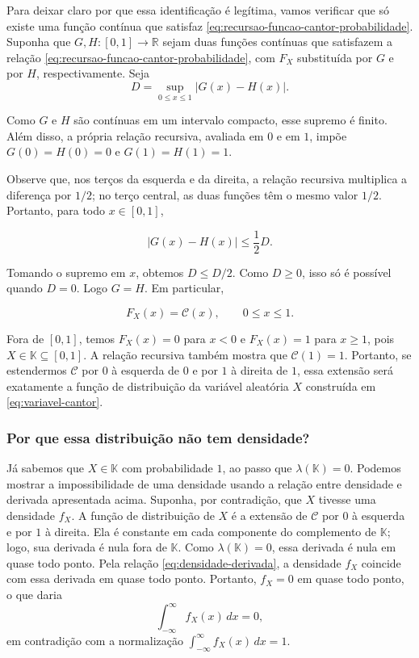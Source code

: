 \documentclass[12pt,portuguese]{article}
\theoremstyle{definition}
\theoremstyle{plainexercise}
\theoremstyle{starredexercise}
\theoremstyle{definition}
\begin{document}
Para deixar claro por que essa identificação é legítima, vamos verificar que
só existe uma função contínua que satisfaz \eqref{eq:recursao-funcao-cantor-probabilidade}.
Suponha que $G,H:[0,1]\to\mathbb{R}$ sejam duas funções contínuas que satisfazem a
relação \eqref{eq:recursao-funcao-cantor-probabilidade}, com $F_X$ substituída
por $G$ e por $H$, respectivamente.
Seja
\[
  D=\sup_{0\leqslant x\leqslant 1}|G(x)-H(x)|.
\]

Como $G$ e $H$ são contínuas em um intervalo compacto, esse supremo é finito.
Além disso, a própria relação recursiva, avaliada em $0$ e em $1$, impõe
$G(0)=H(0)=0$ e $G(1)=H(1)=1$.

Observe que, nos terços da esquerda e da direita, a relação recursiva multiplica a diferença por
$1/2$; no terço central, as duas funções têm o mesmo valor $1/2$. Portanto,
para todo $x\in[0,1]$,

\[
  |G(x)-H(x)|\leqslant\frac{1}{2}D.
\]

Tomando o supremo em $x$, obtemos $D\leqslant D/2$. Como $D\geqslant0$, isso
só é possível quando $D=0$. Logo $G=H$. Em particular,

\begin{equation}\label{eq:funcao-distribuicao-cantor}
  F_X(x)=\mathcal{C}(x),
  \qquad 0\leqslant x\leqslant 1.
\end{equation}

Fora de $[0,1]$, temos $F_X(x)=0$ para $x<0$ e $F_X(x)=1$ para $x\geqslant1$,
pois $X\in\mathbb{K}\subseteq[0,1]$. A relação recursiva também mostra que
$\mathcal{C}(1)=1$. Portanto, se estendermos $\mathcal{C}$ por $0$ à esquerda
de $0$ e por $1$ à direita de $1$, essa extensão será exatamente a função de
distribuição da variável aleatória $X$ construída em
\eqref{eq:variavel-cantor}.

\subsubsection{Por que essa distribuição não tem densidade?}

Já sabemos que $X\in\mathbb{K}$ com probabilidade $1$, ao passo que
$\lambda(\mathbb{K})=0$. Podemos mostrar a impossibilidade de uma densidade
usando a relação entre densidade e derivada apresentada acima. Suponha, por
contradição, que $X$ tivesse uma densidade $f_X$. A função de distribuição de
$X$ é a extensão de $\mathcal{C}$ por $0$ à esquerda e por $1$ à direita. Ela
é constante em cada componente do complemento de $\mathbb{K}$; logo, sua
derivada é nula fora de $\mathbb{K}$. Como $\lambda(\mathbb{K})=0$, essa
derivada é nula em quase todo ponto. Pela relação \eqref{eq:densidade-derivada},
a densidade $f_X$ coincide com essa derivada em quase todo ponto. Portanto,
$f_X=0$ em quase todo ponto, o que daria
\[
  \int_{-\infty}^{\infty}f_X(x)\,dx=0,
\]
em contradição com a normalização
$\int_{-\infty}^{\infty}f_X(x)\,dx=1$.
\end{document}
